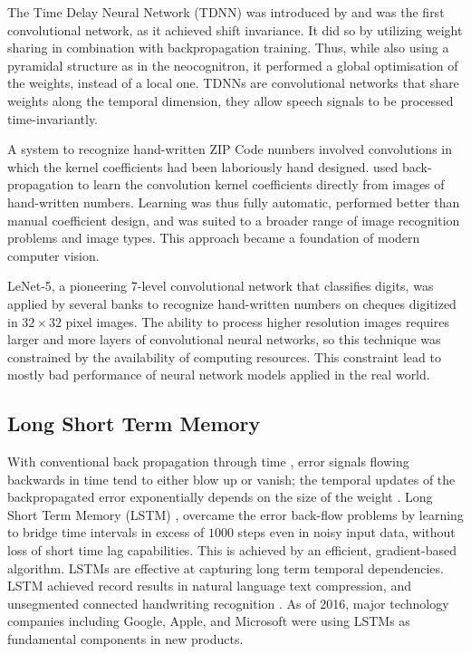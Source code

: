 \documentclass[12pt]{report}
\numberwithin{equation}{section}
\begin{document}
The Time Delay Neural Network (TDNN) was introduced by {\cite{10.5555/108235.108263}} and was the first convolutional network, as it achieved shift invariance. It did so by utilizing weight sharing in combination with backpropagation training. Thus, while also using a pyramidal structure as in the neocognitron, it performed a global optimisation of the weights, instead of a local one. TDNNs are convolutional networks that share weights along the temporal dimension, they allow speech signals to be processed time-invariantly.

A system to recognize hand-written ZIP Code numbers {\cite{NIPS1988_107}}  involved convolutions in which the kernel coefficients had been laboriously hand designed. {\cite{LeCun:89}} used back-propagation to learn the convolution kernel coefficients directly from images of hand-written numbers. Learning was thus fully automatic, performed better than manual coefficient design, and was suited to a broader range of image recognition problems and image types. This approach became a foundation of modern computer vision. 

LeNet-5, a pioneering 7-level convolutional network {\cite{lecun-gradientbased-learning-applied-1998}} that classifies digits, was applied by several banks to recognize hand-written numbers on  cheques digitized in $32\times 32$ pixel images. The ability to process higher resolution images requires larger and more layers of convolutional neural networks, so this technique was constrained by the availability of computing resources. This constraint lead to mostly bad performance of neural network models applied in the real world. 


\subsection{Long Short Term Memory}
With conventional back propagation through time {\cite{Werbos:88gasmarket}}, error signals flowing backwards in time tend to either blow up or vanish; the temporal updates of the backpropagated error exponentially depends on the size of the weight {\cite{10.1162/neco.1997.9.8.1735}}. Long Short Term Memory (LSTM) {\cite{10.1162/neco.1997.9.8.1735}}, overcame the error back-flow problems by learning to bridge time intervals in excess of $1000$ steps even in noisy input data, without loss of short time lag capabilities. This is achieved by an efficient, gradient-based algorithm. LSTMs are effective at capturing long term temporal dependencies. LSTM achieved record results in natural language text compression, and unsegmented connected handwriting recognition {\cite{graves09}}. As of 2016, major technology companies including Google, Apple, and Microsoft were using LSTMs as fundamental components in new products.
\end{document}
